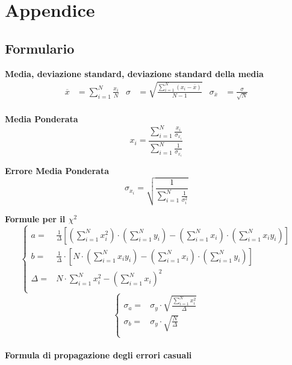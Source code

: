 \documentclass[a4paper,11pt,oneside]{article}
\begin{document}
\section{Appendice}

\subsection{Formulario}
\textbf{Media, deviazione standard, deviazione standard della media}
\begin{align*}
        \overline{x}&=\sum\limits_{i=1}^{N} \frac{x_{i}}{N}&
        \sigma&=\sqrt{\frac{\sum\limits_{i=1}^{N} (x_{i}-\overline{x})}{N-1}}&
        \sigma_{\overline{x}}&=\frac{\sigma}{\sqrt{N}}
\end{align*}\\

\textbf{Media Ponderata}
\begin{equation*}
\label{eq:media_pond}
    x_i=\frac{\sum_{i=1}^{N}\frac{x_i}{\sigma_{x_i}}}{\sum_{i=1}^{N}\frac{1}{\sigma_{x_i}}}
\end{equation*}

\textbf{Errore Media Ponderata}
\begin{equation*}
\label{eq:errore_media_pond}
     \sigma_{x_i}=\sqrt{\frac{1}{\sum_{i=1}^{N}\frac{1}{\sigma_{i}^{2}}}}
\end{equation*}

\textbf{Formule per il ${\chi}^2$}
\begin{equation*}
        \begin{cases}
    a=&\frac{1}{\Delta}[(\sum\limits_{i=1}^{N}{x_{i}^{2}})\cdot(\sum\limits_{i=1}^{N}{y_{i}})-(\sum\limits_{i=1}^{N}{x_{i}})\cdot(\sum\limits_{i=1}^{N}{x_{i}y_{i}})] \\ 
    b=&\frac{1}{\Delta }\cdot \left [N\cdot \left ( \sum\limits_{i=1}^{N}x_i y_i \right )-\left ( \sum\limits_{i=1}^{N}x_i \right )\cdot \left ( \sum\limits_{i=1}^{N}y_i \right )  \right ]\\
    \Delta=& N\cdot \sum\limits_{i=1}^{N} x_i^{2} - \left ( \sum\limits_{i=1}^{N}x_i \right )^{2}\\
    \end{cases}
\end{equation*}
\begin{equation*}
    \begin{cases}
    \sigma_{a}=&\sigma_{y}\cdot\sqrt{\frac{\sum_{i=1}^{N}{x_{i}^{2}}}{\Delta}} \\
    \sigma_{b}=&\sigma_y\cdot \sqrt{\frac{N}{\Delta }}\\
    \end{cases}
    \label{equation:err_chi_quadro}
\end{equation*}
\\
\textbf{Formula di propagazione degli errori casuali}\\
\end{document}
